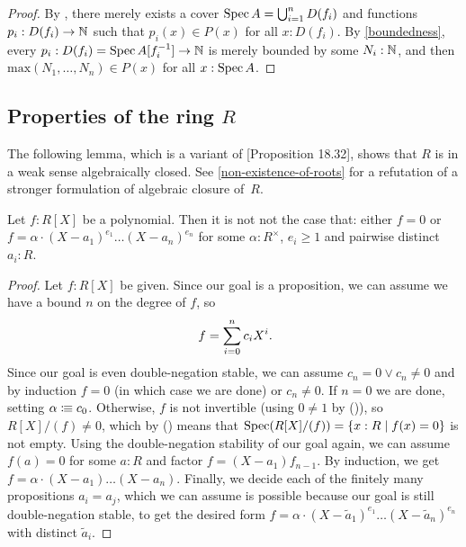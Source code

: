 \begin{proof}
  By ,
  there merely exists a cover
  $\operatorname{Spec} A = \bigcup_{i = 1}^n D(f_i)$
  and functions $p_i : D(f_i) \to \mathbb{N}$
  such that $p_i(x) \in P(x)$ for all $x : D(f_i)$.
  By \cref{boundedness},
  every $p_i : D(f_i) = \operatorname{Spec} A[f_i^{-1}] \to \mathbb{N}$
  is merely bounded by some $N_i : \mathbb{N}$,
  and then $\mathrm{max}(N_1, \dots, N_n) \in P(x)$ for all $x : \operatorname{Spec} A$.
\end{proof}

\subsection{Properties of the ring $R$}

The following lemma,
which is a variant of \cite{ingo-thesis}[Proposition 18.32],
shows that $R$ is in a weak sense algebraically closed.
See \cref{non-existence-of-roots} for a refutation of
a stronger formulation of algebraic closure of~$R$.

\begin{lemma}%
  \label{polynomials-notnot-decompose}
  Let $f : R[X]$ be a polynomial.
  Then it is not not the case that:
  either $f = 0$ or
  $f = \alpha \cdot {(X - a_1)}^{e_1} \dots {(X - a_n)}^{e_n}$
  for some $\alpha : R^\times$,
  $e_i \geq 1$ and pairwise distinct $a_i : R$.
\end{lemma}

\begin{proof}
  Let $f : R[X]$ be given.
  Since our goal is a proposition,
  we can assume we have a bound $n$ on the degree of $f$,
  so
  \[ f = \sum_{i = 0}^n c_i X^i \rlap{.} \]
  Since our goal is even double-negation stable,
  we can assume $c_n = 0 \lor c_n \neq 0$
  and by induction $f = 0$ (in which case we are done)
  or $c_n \neq 0$.
  If $n = 0$ we are done,
  setting $\alpha \vcentcolon\mspace{-1.2mu}\equiv c_0$.
  Otherwise,
  $f$ is not invertible (using $0 \neq 1$ by ()),
  so $R[X]/(f) \neq 0$,
  which by () means that
  $\operatorname{Spec}(R[X]/(f)) = \{ x : R \mid f(x) = 0 \}$
  is not empty.
  Using the double-negation stability of our goal again,
  we can assume $f(a) = 0$ for some $a : R$
  and factor $f = (X - a_1) f_{n - 1}$.
  By induction, we get $f = \alpha \cdot (X - a_1) \dots (X - a_n)$.
  Finally, we decide each of the finitely many propositions $a_i = a_j$,
  which we can assume is possible
  because our goal is still double-negation stable,
  to get the desired form
  $f = \alpha \cdot {(X - \widetilde{a}_1)}^{e_1} \dots {(X - \widetilde{a}_n)}^{e_n}$
  with distinct $\widetilde{a}_i$.
\end{proof}
